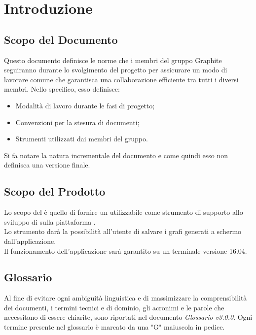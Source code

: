 \documentclass[./NormediProgetto.tex]{subfiles}
\begin{document}
	
\chapter{Introduzione}

\section{Scopo del Documento}

Questo documento definisce le norme che i membri del gruppo Graphite seguiranno durante lo svolgimento del progetto per assicurare un modo di lavorare comune che garantisca una collaborazione efficiente tra tutti i diversi
membri. Nello specifico, esso definisce:

\begin{itemize}
	\item Modalità di lavoro durante le fasi di progetto;
	\item Convenzioni per la stesura di documenti;
	\item Strumenti utilizzati dai membri del gruppo.
\end{itemize}
Si fa notare la natura incrementale del documento e come quindi esso non definisca una versione finale.
\section{Scopo del Prodotto}

Lo scopo del  è quello di fornire un  utilizzabile come strumento di supporto allo sviluppo di  sulla piattaforma . 
\\ \noindent Lo strumento darà la possibilità all'utente di salvare i grafi generati a schermo dall'applicazione.
\\ \noindent Il funzionamento dell'applicazione sarà garantito su un terminale  versione 16.04.

\section{Glossario}

Al fine di evitare ogni ambiguità linguistica e di massimizzare la comprensibilità dei documenti, i termini tecnici e di dominio, gli acronimi e le parole che necessitano di essere chiarite, sono riportati nel documento \textit{Glossario v3.0.0}.
Ogni termine presente nel glossario è marcato da una "G" maiuscola in pedice.
\end{document}
